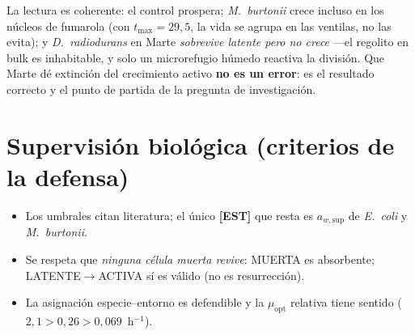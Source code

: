 \documentclass[11pt]{article}
\newcommand{\MUERTA}{\textcolor{acmuerta}{\textsf{MUERTA}}}
\newcommand{\LATENTE}{\textcolor{aclatente}{\textsf{LATENTE}}}
\newcommand{\ACTIVA}{\textcolor{acactiva}{\textsf{ACTIVA}}}
\begin{document}
La lectura es coherente: el control prospera; \emph{M.\ burtonii} crece incluso en
los núcleos de fumarola (con $t_{\max}=29{,}5$, la vida se agrupa en las ventilas,
no las evita); y \emph{D.\ radiodurans} en Marte \emph{sobrevive latente pero no
crece} —el regolito en bulk es inhabitable, y solo un microrefugio húmedo
reactiva la división. Que Marte dé extinción del crecimiento activo \textbf{no es
un error}: es el resultado correcto y el punto de partida de la pregunta de
investigación.

\section*{Supervisión biológica (criterios de la defensa)}
\begin{itemize}[nosep]
  \item Los umbrales citan literatura; el único \textbf{[EST]} que resta es
  $a_{w,\text{sup}}$ de \emph{E.\ coli} y \emph{M.\ burtonii}.
  \item Se respeta que \emph{ninguna célula muerta revive}: \MUERTA{} es absorbente;
  \LATENTE$\to$\ACTIVA{} sí es válido (no es resurrección).
  \item La asignación especie--entorno es defendible y la $\mu_{\mathrm{opt}}$
  relativa tiene sentido ($2{,}1 > 0{,}26 > 0{,}069$~h$^{-1}$).
\end{itemize}
\end{document}
